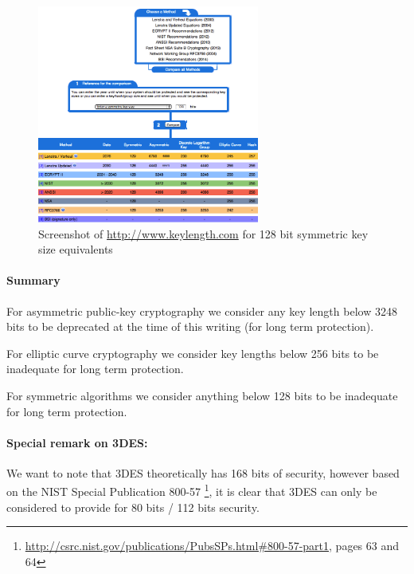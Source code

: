 \begin{figure}[h]
  \centering
  \includegraphics[width=0.65\textwidth]{img/keylengths_com.png}
  \caption{Screenshot of \url{http://www.keylength.com} for 128 bit symmetric key size equivalents}
  \label{fig:keylengths.com}
\end{figure}


\paragraph{Summary}
\begin{itemize*}
  \item For asymmetric public-key cryptography we consider any key length below
3248 bits to be deprecated at the time of this writing (for long term
protection).
  \item For elliptic curve cryptography we consider key lengths below 256 bits to
be inadequate for long term protection.  
  \item For symmetric algorithms we consider anything below 128 bits to be
inadequate for long term protection.
\end{itemize*}

\paragraph{Special remark on 3DES:}
We want to note that 3DES theoretically has 168 bits of security, however based
on the NIST Special Publication 800-57
\footnote{\url{http://csrc.nist.gov/publications/PubsSPs.html\#800-57-part1},
pages 63 and 64}, it is clear that 3DES can only be considered to provide for
80 bits / 112 bits security.
